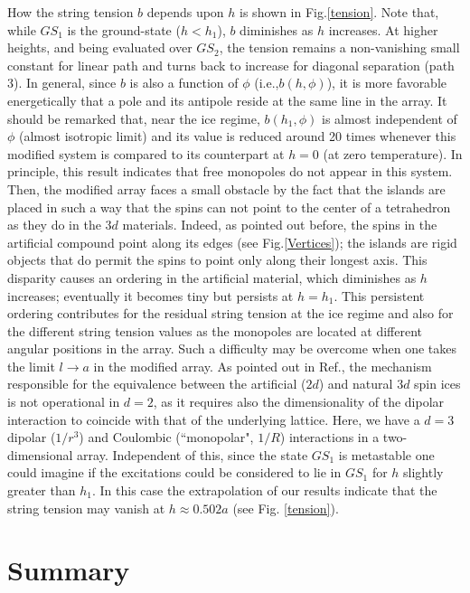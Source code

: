 \documentclass[aps,prb,twocolumn,floatfix,showpacs,amsmath,amssymb]{revtex4}
\begin{document}
How the string tension $b$ depends upon $h$ is shown in
Fig.\ref{tension}. Note that, while $GS_1$ is the
ground-state ($h<h_1$), $b$ diminishes as $h$ increases. At higher
heights, and being evaluated over $GS_2$, the tension remains a
non-vanishing small constant for linear path and turns back to
increase for diagonal separation (path 3). In general,
since $b$ is also a function of $\phi$ (i.e.,$b(h,\phi)$), it is
more favorable energetically that a pole and its antipole reside
at the same line in the array. It should be remarked
that, near the ice regime, $b(h_{1},\phi)$ is almost independent
of $\phi$ (almost isotropic limit) and its value is reduced
around 20 times whenever this modified system is compared
to its counterpart at $h=0$ (at zero temperature). In principle,
this result indicates that free monopoles do not appear in this
system. Then, the modified array \cite{Moller09} faces a small obstacle
by the fact that the islands are placed in such a way that the
spins can not point to the center of a tetrahedron as they do in
the $3d$ materials. Indeed, as pointed out before, the spins in
the artificial compound point along its edges (see
Fig.\ref{Vertices}); the islands are rigid objects that do permit
the spins to point only along their longest axis. This disparity
causes an ordering in the artificial material, which diminishes as
$h$ increases; eventually it becomes tiny but persists at
$h=h_{1}$. This persistent ordering contributes for the residual
string tension at the ice regime and also for the different string
tension values as the monopoles are located at different angular
positions in the array. Such a difficulty may be overcome when one
takes the limit $l\rightarrow a$ in the modified array. As pointed
out in Ref., the mechanism responsible for
the equivalence between the artificial ($2d$) and natural $3d$
spin ices is not operational in $d=2$, as it requires also the
dimensionality of the dipolar interaction to coincide with that of
the underlying lattice. Here, we have a $d=3$ dipolar ($1/r^{3}$)
and Coulombic (``monopolar", $1/R$) interactions in a
two-dimensional array. Independent of this, since the state
$GS_1$ is metastable one could imagine if the excitations could be
considered to lie in $GS_1$ for $h$ slightly greater than $h_1$.
In this case the extrapolation of our results indicate that the
string tension may vanish at $h\approx 0.502 a$ (see Fig.
\ref{tension}).

\section{Summary}
\end{document}
